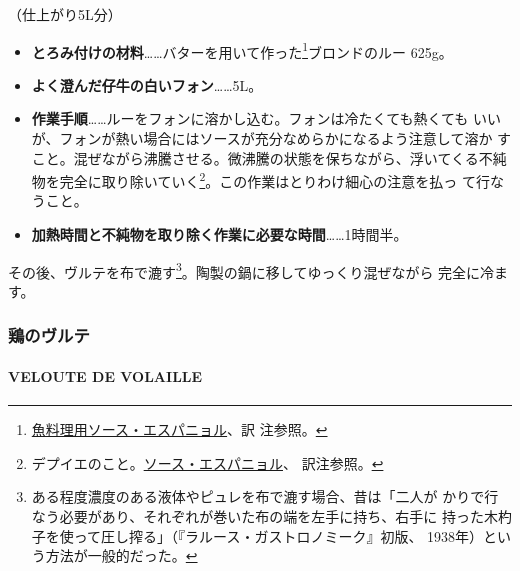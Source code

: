 \begin{recette}
 

（仕上がり5L分）

\begin{itemize}
\item
  \textbf{とろみ付けの材料}\ldots{}\ldots{}バターを用いて作った\footnote{\protect\hyperlink{sauce-espagnole-maigre}{魚料理用ソース・エスパニョル}、訳
    注参照。}ブロンドのルー 625g。
\item
  \textbf{よく澄んだ仔牛の白いフォン}\ldots{}\ldots{}5L。
\item
  \textbf{作業手順}\ldots{}\ldots{}ルーをフォンに溶かし込む。フォンは冷たくても熱くても
  いいが、フォンが熱い場合にはソースが充分なめらかになるよう注意して溶か
  すこと。混ぜながら沸騰させる。微沸騰の状態を保ちながら、浮いてくる不純
  物を完全に取り除いていく\footnote{デプイエのこと。\protect\hyperlink{sauce-espagnole}{ソース・エスパニョル}、
    訳注参照。}。この作業はとりわけ細心の注意を払っ て行なうこと。
\item
  \textbf{加熱時間と不純物を取り除く作業に必要な時間}\ldots{}\ldots{}1時間半。
\end{itemize}

その後、ヴルテを布で漉す\footnote{ある程度濃度のある液体やピュレを布で漉す場合、昔は「二人が
  かりで行なう必要があり、それぞれが巻いた布の端を左手に持ち、右手に
  持った木杓子を使って圧し搾る」（『ラルース・ガストロノミーク』初版、
  1938年）という方法が一般的だった。}。陶製の鍋に移してゆっくり混ぜながら
完全に冷ます。

\maeaki

\hypertarget{ux9d8fux306eux30f4ux30ebux30c6}{%
\subsubsection{鶏のヴルテ}\label{ux9d8fux306eux30f4ux30ebux30c6}}

\hypertarget{veloute-de-volaille}{%
\paragraph{VELOUTE DE VOLAILLE}\label{veloute-de-volaille}}


\end{recette}
